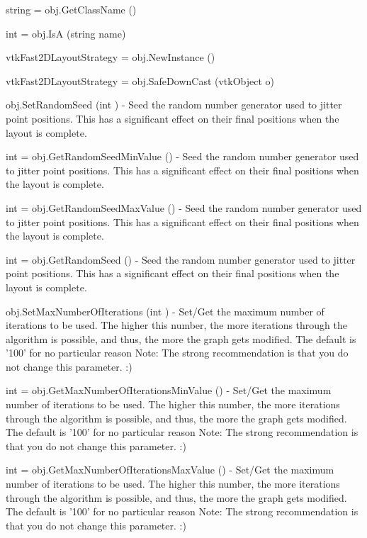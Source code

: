 \begin{DoxyItemize}
\item {\ttfamily string = obj.\-Get\-Class\-Name ()}  
\item {\ttfamily int = obj.\-Is\-A (string name)}  
\item {\ttfamily vtk\-Fast2\-D\-Layout\-Strategy = obj.\-New\-Instance ()}  
\item {\ttfamily vtk\-Fast2\-D\-Layout\-Strategy = obj.\-Safe\-Down\-Cast (vtk\-Object o)}  
\item {\ttfamily obj.\-Set\-Random\-Seed (int )} -\/ Seed the random number generator used to jitter point positions. This has a significant effect on their final positions when the layout is complete.  
\item {\ttfamily int = obj.\-Get\-Random\-Seed\-Min\-Value ()} -\/ Seed the random number generator used to jitter point positions. This has a significant effect on their final positions when the layout is complete.  
\item {\ttfamily int = obj.\-Get\-Random\-Seed\-Max\-Value ()} -\/ Seed the random number generator used to jitter point positions. This has a significant effect on their final positions when the layout is complete.  
\item {\ttfamily int = obj.\-Get\-Random\-Seed ()} -\/ Seed the random number generator used to jitter point positions. This has a significant effect on their final positions when the layout is complete.  
\item {\ttfamily obj.\-Set\-Max\-Number\-Of\-Iterations (int )} -\/ Set/\-Get the maximum number of iterations to be used. The higher this number, the more iterations through the algorithm is possible, and thus, the more the graph gets modified. The default is '100' for no particular reason Note\-: The strong recommendation is that you do not change this parameter. \-:)  
\item {\ttfamily int = obj.\-Get\-Max\-Number\-Of\-Iterations\-Min\-Value ()} -\/ Set/\-Get the maximum number of iterations to be used. The higher this number, the more iterations through the algorithm is possible, and thus, the more the graph gets modified. The default is '100' for no particular reason Note\-: The strong recommendation is that you do not change this parameter. \-:)  
\item {\ttfamily int = obj.\-Get\-Max\-Number\-Of\-Iterations\-Max\-Value ()} -\/ Set/\-Get the maximum number of iterations to be used. The higher this number, the more iterations through the algorithm is possible, and thus, the more the graph gets modified. The default is '100' for no particular reason Note\-: The strong recommendation is that you do not change this parameter. \-:)  

\end{DoxyItemize}
